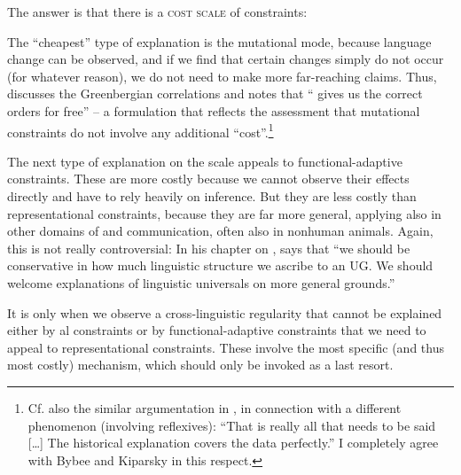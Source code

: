 \documentclass[output=paper]{langsci/langscibook}
\begin{document}
  The answer is that there is a \textsc{cost scale} of constraints: 


The “cheapest” type of explanation is the mutational mode, because language change can be observed, and if we find that certain changes simply do not occur (for whatever reason), we do not need to make more far-reaching claims. Thus, \citet[111]{Bybee2010} discusses the Greenbergian  correlations and notes that “ gives us the correct orders for free” – a formulation that reflects the assessment that mutational constraints do not involve any additional “cost”.\footnote{Cf. also the similar argumentation in \citet[33]{Kiparsky2008}, in connection with a different phenomenon (involving reflexives): “That is really all that needs to be said […] The historical explanation covers the data perfectly.” I completely agree with Bybee and Kiparsky in this respect.}

The next type of explanation on the scale appeals to functional-adaptive constraints. These are more costly because we cannot observe their effects directly and have to rely heavily on inference. But they are less costly than representational constraints, because they are far more general, applying also in other domains of   and communication, often also in nonhuman animals. Again, this is not really controversial: In his chapter on , \citet[79]{Jackendoff2002} says that “we should be conservative in how much linguistic structure we ascribe to an  UG. We should welcome explanations of linguistic universals on more general  grounds.”

It is only when we observe a cross-linguistic regularity that cannot be explained either by al constraints or by functional-adaptive constraints that we need to appeal to representational constraints. These involve the most specific (and thus most costly) mechanism, which should only be invoked as a last resort.
\end{document}
